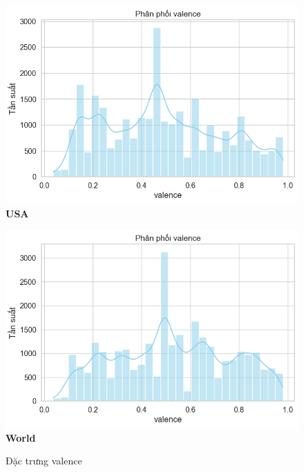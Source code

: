 \begin{itemize}
\begin{figure}[H]
        \begin{minipage}{0.45\textwidth}
            \centering
            \includegraphics[width=\linewidth]{../graphics/data_top50/figure/5/EDA_usa.png}
            \\[4pt] {\small \textbf{USA}}
        \end{minipage}
        \hfill
        \begin{minipage}{0.45\textwidth}
            \centering
            \includegraphics[width=\linewidth]{../graphics/data_top50/figure/5/EDA_world.png}
            \\[4pt] {\small \textbf{World}}
        \end{minipage}



        
        \caption{Đặc trưng valence}
        \label{fig:energy-regions}
    \end{figure}
    


\end{itemize}
